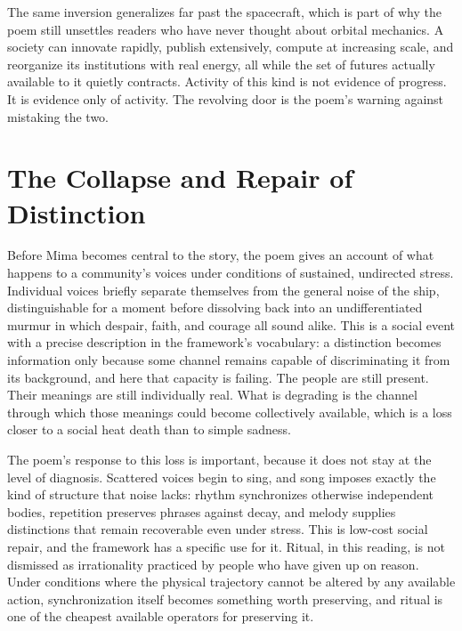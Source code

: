 \documentclass[11pt]{article}
\begin{document}
The same inversion generalizes far past the spacecraft, which is part of why the poem still unsettles readers who have never thought about orbital mechanics. A society can innovate rapidly, publish extensively, compute at increasing scale, and reorganize its institutions with real energy, all while the set of futures actually available to it quietly contracts. Activity of this kind is not evidence of progress. It is evidence only of activity. The revolving door is the poem's warning against mistaking the two.

\section{The Collapse and Repair of Distinction}

Before Mima becomes central to the story, the poem gives an account of what happens to a community's voices under conditions of sustained, undirected stress. Individual voices briefly separate themselves from the general noise of the ship, distinguishable for a moment before dissolving back into an undifferentiated murmur in which despair, faith, and courage all sound alike. This is a social event with a precise description in the framework's vocabulary: a distinction becomes information only because some channel remains capable of discriminating it from its background, and here that capacity is failing. The people are still present. Their meanings are still individually real. What is degrading is the channel through which those meanings could become collectively available, which is a loss closer to a social heat death than to simple sadness.

The poem's response to this loss is important, because it does not stay at the level of diagnosis. Scattered voices begin to sing, and song imposes exactly the kind of structure that noise lacks: rhythm synchronizes otherwise independent bodies, repetition preserves phrases against decay, and melody supplies distinctions that remain recoverable even under stress. This is low-cost social repair, and the framework has a specific use for it. Ritual, in this reading, is not dismissed as irrationality practiced by people who have given up on reason. Under conditions where the physical trajectory cannot be altered by any available action, synchronization itself becomes something worth preserving, and ritual is one of the cheapest available operators for preserving it.
\end{document}
